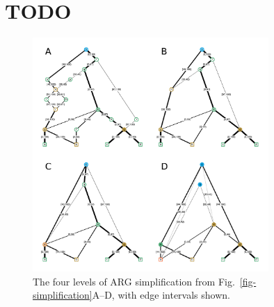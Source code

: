 \documentclass{article}
\begin{document}
\clearpage
\section{TODO}
\label{sec-x}


\begin{figure}[ht]
	\begin{center}
		\includegraphics[width=0.8\textwidth]{illustrations/simplification-with-edges.pdf}
	\end{center}
	\caption{\label{fig-simplification-with-edges}
	The four levels of ARG simplification from Fig.~\ref{fig-simplification}A--D, with edge intervals shown.
	}
\end{figure}
\end{document}
